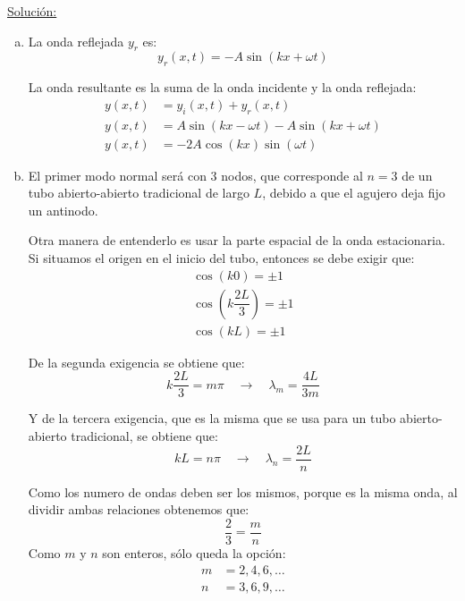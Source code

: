 \underline{Soluci\'on:}

\begin{enumerate}[a)]
	\item La onda reflejada $y_r$ es:
	\begin{equation*}
		y_r (x,t) = -A \sin \left( k x + \omega t \right)
	\end{equation*}
	
	La onda resultante es la suma de la onda incidente y la onda reflejada:
	\begin{align*}
		y(x,t) &= y_i(x,t) + y_r(x,t) \\
		y(x,t) &= A \sin \left( kx - \omega t \right) - A \sin \left( k x + \omega t \right) \\
		y(x,t) &= -2 A \cos \left( kx \right) \sin \left( \omega t \right)
	\end{align*}

	\item El primer modo normal será con 3 nodos, que corresponde al $n=3$ de un tubo abierto-abierto tradicional de largo $L$, debido a que el agujero deja fijo un antinodo.
	
	Otra manera de entenderlo es usar la parte espacial de la onda estacionaria. Si situamos el origen en el inicio del tubo, entonces se debe exigir que:
	\begin{align*}
		\cos \left( k 0 \right) = \pm 1 \\
		\cos \left( k \dfrac{2L}{3} \right) = \pm 1 \\
		\cos \left( k L \right) = \pm 1
	\end{align*}
	
	De la segunda exigencia se obtiene que:
	\begin{equation*}
		k \dfrac{2L}{3} = m \pi \quad\rightarrow\quad \lambda_m = \dfrac{4L}{3m}
	\end{equation*}
	
	Y de la tercera exigencia, que es la misma que se usa para un tubo abierto-abierto tradicional, se obtiene que:
	\begin{equation*}
		k L = n \pi \quad\rightarrow\quad \lambda_n = \dfrac{2L}{n}
	\end{equation*}
	
	Como los numero de ondas deben ser los mismos, porque es la misma onda, al dividir ambas relaciones obtenemos que:
	\begin{equation*}
		\dfrac{2}{3} = \dfrac{m}{n}
	\end{equation*}
	Como $m$ y $n$ son enteros, sólo queda la opción:
	\begin{align*}
		m &= 2, 4, 6, \dots \\
		n &= 3, 6, 9, \dots
	\end{align*}
	

\end{enumerate}
